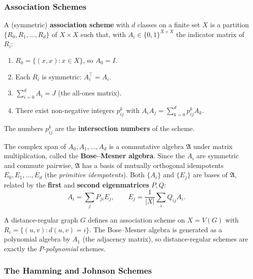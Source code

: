 \subsubsection{Association Schemes}

\begin{definition}\label{def:scheme}
A (symmetric) \textbf{association scheme} with $d$ classes on a finite
set $X$ is a partition $\{R_0, R_1, \ldots, R_d\}$ of $X \times X$ such
that, with $A_i \in \{0, 1\}^{X \times X}$ the indicator matrix of
$R_i$:
\begin{enumerate}
  \item $R_0 = \{(x, x) : x \in X\}$, so $A_0 = I$.
  \item Each $R_i$ is symmetric: $A_i^\top = A_i$.
  \item $\sum_{i = 0}^{d} A_i = J$ (the all-ones matrix).
  \item There exist non-negative integers $p_{ij}^k$ with
        $A_i A_j = \sum_{k = 0}^{d} p_{ij}^k A_k$.
\end{enumerate}
The numbers $p_{ij}^k$ are the \textbf{intersection numbers} of the
scheme.
\end{definition}

\begin{theorem}\label{thm:bosemesner}
The complex span of $A_0, A_1, \ldots, A_d$ is a commutative algebra
$\mathfrak A$ under matrix multiplication, called the \textbf{Bose--Mesner
algebra}. Since the $A_i$ are symmetric and commute pairwise,
$\mathfrak A$ has a basis of mutually orthogonal idempotents
$E_0, E_1, \ldots, E_d$ (the \emph{primitive idempotents}). Both
$\{A_i\}$ and $\{E_j\}$ are bases of $\mathfrak A$, related by the
\textbf{first} and \textbf{second eigenmatrices} $P, Q$:
\[
  A_i = \sum_{j} P_{ji} E_j, \qquad E_j = \frac{1}{|X|} \sum_{i} Q_{ij} A_i.
\]
\end{theorem}

\begin{theorem}[Distance-regular = $P$-polynomial]
A distance-regular graph $G$ defines an association scheme on
$X = V(G)$ with $R_i = \{(u, v) : d(u, v) = i\}$. The Bose--Mesner
algebra is generated as a polynomial algebra by $A_1$ (the adjacency
matrix), so distance-regular schemes are exactly the
\emph{$P$-polynomial} schemes.
\end{theorem}

\subsubsection{The Hamming and Johnson Schemes}

